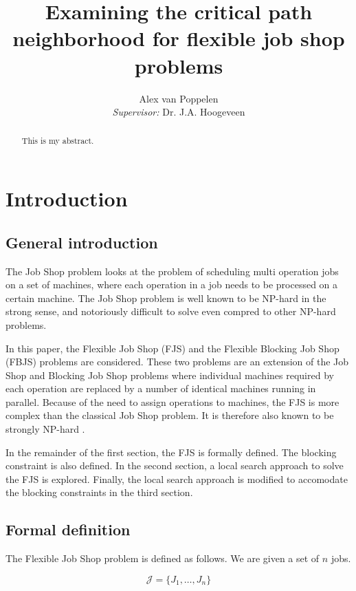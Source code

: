 \documentclass[a4paper,10pt]{article}
\title{Examining the critical path neighborhood for flexible job shop problems}
\author{Alex van Poppelen\smallskip\\
\emph{Supervisor:} Dr. J.A. Hoogeveen}
\begin{document}
\maketitle

\begin{abstract}

This is my abstract.

\end{abstract}

\tableofcontents

\section{Introduction}

\subsection{General introduction}

The Job Shop problem looks at the problem of scheduling multi operation jobs on a set of machines, where each operation in a job needs to be processed on a certain machine. The Job Shop problem is well known to be NP-hard in the strong sense, and notoriously difficult to solve even compred to other NP-hard problems.

In this paper, the Flexible Job Shop (FJS) and the Flexible Blocking Job Shop (FBJS) problems are considered. These two problems are an extension of the Job Shop and Blocking Job Shop problems where individual machines required by each operation are replaced by a number of identical machines running in parallel. Because of the need to assign operations to machines, the FJS is more complex than the classical Job Shop problem. It is therefore also known to be strongly NP-hard \cite{approxfjsp}.

In the remainder of the first section, the FJS is formally defined. The blocking constraint is also defined. In the second section, a local search approach to solve the FJS is explored. Finally, the local search approach is modified to accomodate the blocking constraints in the third section.

\subsection{Formal definition}

The Flexible Job Shop problem is defined as follows. We are given a set of $n$ jobs.

\[ \mathcal{J} = \{J_1, \dots, J_n\} \]
\end{document}
